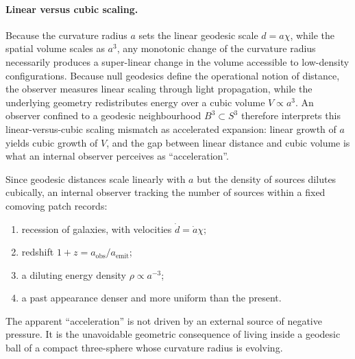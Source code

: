 \documentclass[12pt,a4paper]{article}
\theoremstyle{plain}
\theoremstyle{definition}
\begin{document}
\paragraph{Linear versus cubic scaling.}
Because the curvature radius $a$ sets the linear geodesic scale
$d = a\chi$, while the spatial volume scales as $a^3$, any monotonic
change of the curvature radius necessarily produces a super-linear change
in the volume accessible to low-density configurations.
Because null geodesics define the operational notion of distance, the
observer measures linear scaling through light propagation, while the
underlying geometry redistributes energy over a cubic volume $V\propto a^3$.
An observer confined to a geodesic neighbourhood $B^3\subset S^3$
therefore interprets this linear-versus-cubic scaling mismatch as
accelerated expansion: linear growth of $a$ yields cubic growth of $V$,
and the gap between linear distance and cubic volume is what an internal
observer perceives as ``acceleration''.

Since geodesic distances scale linearly with $a$ but the density of
sources dilutes cubically, an internal observer tracking the number of
sources within a fixed comoving patch records:
\begin{enumerate}[label=(\roman*)]
  \item recession of galaxies, with velocities $\dot d = \dot a\chi$;
  \item redshift $1+z = a_{\mathrm{obs}}/a_{\mathrm{emit}}$;
  \item a diluting energy density $\rho\propto a^{-3}$;
  \item a past appearance denser and more uniform than the present.
\end{enumerate}
The apparent ``acceleration'' is not driven by an external source of
negative pressure. It is the unavoidable geometric consequence of living
inside a geodesic ball of a compact three-sphere whose curvature radius
is evolving.
\end{document}
